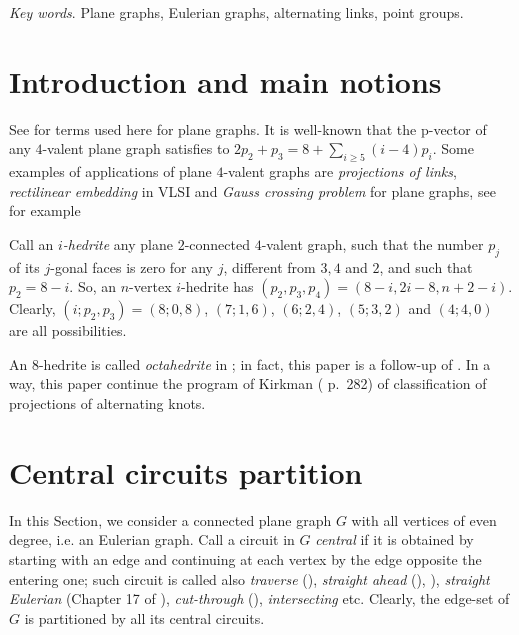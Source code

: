 \documentclass[12pt]{article}
\begin{document}
{\em Key words}. Plane graphs, Eulerian graphs, alternating links, point groups.

\section{Introduction and main notions}

See \cite{Gr} for terms used here for plane graphs.
It is well-known that the p-vector of any $4$-valent plane graph satisfies to
$2p_2+p_3=8+ \sum_{i\geq 5} (i-4)p_i$.
Some examples of applications of plane $4$-valent graphs are {\em projections
of links}, {\em rectilinear embedding} in VLSI and {\em Gauss crossing 
problem} for plane graphs, see for example \cite{Liu}

\vspace{2mm}


Call an {\em $i$-hedrite} any plane $2$-connected
$4$-valent graph, such that the number
$p_j$ of its $j$-gonal faces is zero for any $j$, different from 
$3,4$ and $2$, and such that $p_2=8-i$. So, 
an $n$-vertex $i$-hedrite has $(p_2, p_3, p_4)=(8-i, 2i-8, n+2-i)$.
Clearly, $(i;p_2,p_3)=(8;0,8)$, $(7;1,6)$, $(6;2,4)$,
$(5;3,2)$ and $(4;4,0)$ are all possibilities. 

An $8$-hedrite is called {\em octahedrite} in \cite{DSt}; in fact, this paper is a follow-up of \cite{DSt}.
In a way, this paper continue the program of Kirkman (\cite{Kirk} p.~282) of classification of projections of alternating knots.


















\section{Central circuits partition}

In this Section, we consider a connected plane graph $G$ with all vertices of 
even degree, i.e. an Eulerian graph. 
Call a circuit in $G$ {\it central} if it is obtained by starting with an
edge and continuing at each vertex by the edge opposite the entering one; such 
circuit is called also {\em traverse} 
(\cite{GK}), {\em straight ahead} (\cite{Ha}),  \cite{PTZ}), 
{\em straight Eulerian} (Chapter 17 of \cite{God}), 
{\em cut-through} (\cite{Je}),
{\em intersecting} etc. Clearly, the edge-set of 
$G$ is partitioned by all its central circuits.
\end{document}
